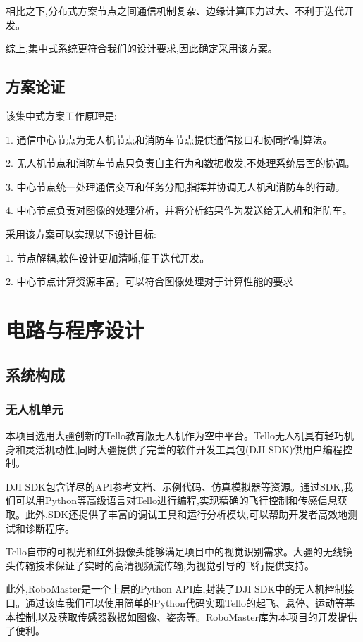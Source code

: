 \documentclass[12pt, a4paper, oneside]{article}
\begin{document}
相比之下,分布式方案节点之间通信机制复杂、边缘计算压力过大、不利于迭代开发。

综上,集中式系统更符合我们的设计要求,因此确定采用该方案。

\subsection{方案论证}

该集中式方案工作原理是:

1. 通信中心节点为无人机节点和消防车节点提供通信接口和协同控制算法。

2. 无人机节点和消防车节点只负责自主行为和数据收发,不处理系统层面的协调。

3. 中心节点统一处理通信交互和任务分配,指挥并协调无人机和消防车的行动。

4. 中心节点负责对图像的处理分析，并将分析结果作为发送给无人机和消防车。

采用该方案可以实现以下设计目标:

1. 节点解耦,软件设计更加清晰,便于迭代开发。

2. 中心节点计算资源丰富，可以符合图像处理对于计算性能的要求

\section{电路与程序设计}

\subsection{系统构成}

\subsubsection{无人机单元}

本项目选用大疆创新的Tello教育版无人机作为空中平台。Tello无人机具有轻巧机身和灵活机动性,同时大疆提供了完善的软件开发工具包(DJI SDK)供用户编程控制。

DJI SDK包含详尽的API参考文档、示例代码、仿真模拟器等资源。通过SDK,我们可以用Python等高级语言对Tello进行编程,实现精确的飞行控制和传感信息获取。此外,SDK还提供了丰富的调试工具和运行分析模块,可以帮助开发者高效地测试和诊断程序。

Tello自带的可视光和红外摄像头能够满足项目中的视觉识别需求。大疆的无线镜头传输技术保证了实时的高清视频流传输,为视觉引导的飞行提供支持。

此外,RoboMaster是一个上层的Python API库,封装了DJI SDK中的无人机控制接口。通过该库我们可以使用简单的Python代码实现Tello的起飞、悬停、运动等基本控制,以及获取传感器数据如图像、姿态等。RoboMaster库为本项目的开发提供了便利。
\end{document}
